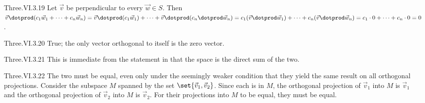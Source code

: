 \begin{ans}{Three.VI.3.19}
      Let $\vec{v}$ be perpendicular to every $\vec{w}\in S$.
      Then
      $\vec{v}\dotprod(c_1\vec{w}_1+\dots+c_n\vec{w}_n)
       =\vec{v}\dotprod(c_1\vec{w}_1)
          +\dots+\vec{v}\dotprod (c_n\dotprod\vec{w}_n)
       =c_1(\vec{v}\dotprod\vec{w}_1)
          +\dots+c_n(\vec{v}\dotprod\vec{w}_n)
       =c_1\cdot 0+\dots+c_n\cdot 0=0$.
    
\end{ans}
\begin{ans}{Three.VI.3.20}
      True; the only vector orthogonal to itself is the zero vector.
    
\end{ans}
\begin{ans}{Three.VI.3.21}
      This is immediate from the statement in
       that the space is the direct sum
      of the two.
    
\end{ans}
\begin{ans}{Three.VI.3.22}
      The two must be equal, even only under the seemingly weaker
      condition that they yield the same result on all orthogonal projections.
      Consider the subspace $M$ spanned by the set
      $\set{\vec{v}_1,\vec{v}_2}$.
      Since each is in $M$, the orthogonal projection of $\vec{v}_1$ into
      $M$ is $\vec{v}_1$ and the orthogonal projection of $\vec{v}_2$ into
      $M$ is $\vec{v}_2$.
      For their projections into $M$ to be equal, they must be equal.
    
\end{ans}
